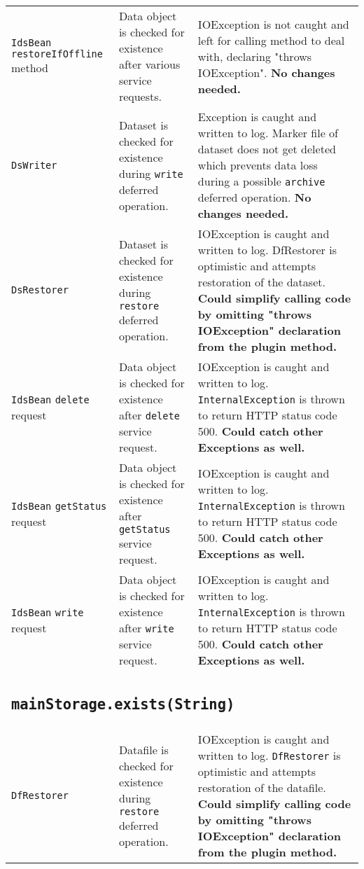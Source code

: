 \documentclass[paper=a4]{scrartcl}
\begin{document}
\begin{longtable}{ p{32mm} | p{48mm} | p{48mm} }
    \raggedright \texttt{IdsBean} \texttt{restoreIfOffline} method &
    \raggedright Data object is checked for existence after various service requests. &
    \raggedright IOException is not caught and left for calling method to deal with, declaring "throws IOException". \textbf{No changes needed.}
    \tabularnewline[4mm]
    \raggedright \texttt{DsWriter} &
    \raggedright Dataset is checked for existence during \texttt{write} deferred operation. &
    \raggedright Exception is caught and written to log. Marker file of dataset does not get deleted which prevents data loss during a possible \texttt{archive} deferred operation. \textbf{No changes needed.}
    \tabularnewline[4mm]
    \raggedright \texttt{DsRestorer} &
    \raggedright Dataset is checked for existence during \texttt{restore} deferred operation. &
    \raggedright IOException is caught and written to log. DfRestorer is optimistic and attempts restoration of the dataset. \textbf{Could simplify calling code by omitting "throws IOException" declaration from the plugin method.}
    \tabularnewline[4mm]
    \raggedright \texttt{IdsBean} \texttt{delete} request &
    \raggedright Data object is checked for existence after \texttt{delete} service request. &
    \raggedright IOException is caught and written to log. \texttt{InternalException} is thrown to return HTTP status code 500. \textbf{Could catch other Exceptions as well.}
    \tabularnewline[4mm]
    \raggedright \texttt{IdsBean} \texttt{getStatus} request &
    \raggedright Data object is checked for existence after \texttt{getStatus} service request. &
    \raggedright IOException is caught and written to log. \texttt{InternalException} is thrown to return HTTP status code 500. \textbf{Could catch other Exceptions as well.}
    \tabularnewline[4mm]
    \raggedright \texttt{IdsBean} \texttt{write} request &
    \raggedright Data object is checked for existence after \texttt{write} service request. &
    \raggedright IOException is caught and written to log. \texttt{InternalException} is thrown to return HTTP status code 500. \textbf{Could catch other Exceptions as well.}
    \tabularnewline

    \multicolumn{3}{p{\textwidth}}{
      \subsection{\texttt{mainStorage.exists(String)}}
    } \\

    \raggedright \texttt{DfRestorer} &
    \raggedright Datafile is checked for existence during \texttt{restore} deferred operation. &
    \raggedright IOException is caught and written to log. \texttt{DfRestorer} is optimistic and attempts restoration of the datafile. \textbf{Could simplify calling code by omitting "throws IOException" declaration from the plugin method.}
    \tabularnewline


\end{longtable}
\end{document}
